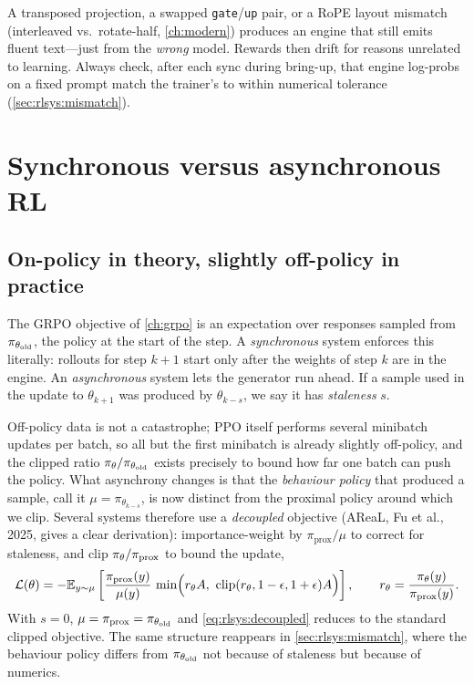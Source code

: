 \begin{pitfall}
A transposed projection, a swapped \texttt{gate}/\texttt{up} pair, or a RoPE layout mismatch
(interleaved vs.\ rotate-half, \cref{ch:modern}) produces an engine that still emits fluent
text---just from the \emph{wrong} model. Rewards then drift for reasons unrelated to learning.
Always check, after each sync during bring-up, that engine log-probs on a fixed prompt match
the trainer's to within numerical tolerance (\cref{sec:rlsys:mismatch}).
\end{pitfall}
\section{Synchronous versus asynchronous RL}\label{sec:rlsys:async}

\subsection{On-policy in theory, slightly off-policy in practice}

The GRPO objective of \cref{ch:grpo} is an expectation over responses sampled from
$\pi_{\theta_{\text{old}}}$, the policy at the start of the step. A \emph{synchronous} system enforces this
literally: rollouts for step $k+1$ start only after the weights of step $k$ are in the
engine. An \emph{asynchronous} system lets the generator run ahead. If a sample used in the
update to $\theta_{k+1}$ was produced by $\theta_{k-s}$, we say it has \emph{staleness} $s$.

Off-policy data is not a catastrophe; PPO itself performs several minibatch updates per batch,
so all but the first minibatch is already slightly off-policy, and the clipped ratio
$\pi_\theta/\pi_{\theta_{\text{old}}}$ exists precisely to bound how far one batch can push the policy. What
asynchrony changes is that the \emph{behaviour policy} that produced a sample, call it
$\mu = \pi_{\theta_{k-s}}$, is now distinct from the proximal policy around which we clip.
Several systems therefore use a \emph{decoupled} objective (AReaL, Fu et al., 2025, gives a
clear derivation): importance-weight by $\pi_{\text{prox}}/\mu$ to correct for staleness, and
clip $\pi_\theta/\pi_{\text{prox}}$ to bound the update,
\begin{equation}
\mathcal{L}(\theta) = -\E_{y\sim\mu}\left[\frac{\pi_{\text{prox}}(y)}{\mu(y)}\,
\min\!\Big(r_\theta A,\ \clip(r_\theta,1-\epsilon,1+\epsilon)A\Big)\right],\qquad
r_\theta = \frac{\pitheta(y)}{\pi_{\text{prox}}(y)}.
\label{eq:rlsys:decoupled}
\end{equation}
With $s=0$, $\mu=\pi_{\text{prox}}=\pi_{\theta_{\text{old}}}$ and \cref{eq:rlsys:decoupled} reduces to the
standard clipped objective. The same structure reappears in \cref{sec:rlsys:mismatch}, where
the behaviour policy differs from $\pi_{\theta_{\text{old}}}$ not because of staleness but because of numerics.

